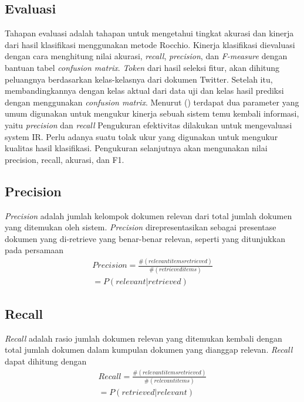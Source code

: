 \subsection*{Evaluasi}
Tahapan evaluasi adalah tahapan untuk mengetahui tingkat akurasi dan kinerja dari hasil klasifikasi menggunakan metode Rocchio. Kinerja klasifikasi dievaluasi dengan cara menghitung nilai akurasi, \textit{recall}, \textit{precision}, dan \textit{F-measure} dengan bantuan tabel \textit{confusion matrix}. \textit{Token} dari hasil seleksi fitur, akan dihitung peluangnya berdasarkan kelas-kelasnya dari dokumen Twitter. Setelah itu, membandingkannya dengan kelas aktual dari data uji dan kelas hasil prediksi dengan menggunakan \textit{confusion matrix}.
Menurut \citeauthor{MANNING2008} (\cite*{MANNING2008}) terdapat dua parameter yang umum digunakan untuk mengukur kinerja sebuah sistem temu kembali informasi, yaitu \textit{precision} dan \textit{recall} Pengukuran efektivitas dilakukan untuk mengevaluasi system IR. Perlu adanya suatu tolak ukur yang digunakan untuk mengukur kualitas hasil klasifikasi. Pengukuran selanjutnya akan mengunakan nilai precision, recall, akurasi, dan F1. 

\subsection*{Precision}
\textit{Precision} adalah jumlah kelompok dokumen relevan dari total jumlah dokumen yang  ditemukan oleh sistem. \textit{Precision} direpresentasikan sebagai presentase dokumen yang di-retrieve yang benar-benar relevan, seperti yang ditunjukkan pada persamaan
\begin{equation}
\begin{split}
Precision = \frac{\#(relevant items retrieved)}{\#(retrieved items)} \\ 
= P(relevant|retrieved)
\label{eq:precision}
\end{split}
\end{equation}

\subsection*{Recall}
\textit{Recall} adalah rasio jumlah dokumen relevan yang ditemukan kembali dengan total jumlah dokumen dalam kumpulan dokumen yang dianggap relevan. \textit{Recall} dapat dihitung dengan 
\begin{equation}
\begin{split}
Recall = \frac{\#(relevant items retrieved)}{\#(relevant items)} \\ 
= P(retrieved|relevant)
\label{eq:recall}
\end{split}
\end{equation}


